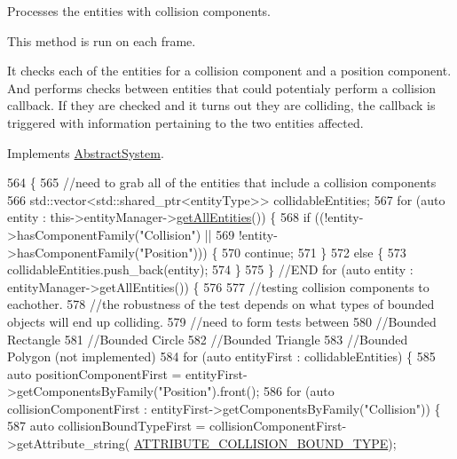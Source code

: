 Processes the entities with collision components. 

This method is run on each frame.

It checks each of the entities for a collision component and a position component. And performs checks between entities that could potentialy perform a collision callback. If they are checked and it turns out they are colliding, the callback is triggered with information pertaining to the two entities affected. 

Implements \hyperlink{class_abstract_system_af8bfe74feb5df2b5e3fff67bfe1106b9}{Abstract\-System}.


\begin{DoxyCode}
564                              \{
565     \textcolor{comment}{//need to grab all of the entities that include a collision components}
566     std::vector<std::shared\_ptr<entityType>> collidableEntities;
567     \textcolor{keywordflow}{for} (\textcolor{keyword}{auto} entity : this->entityManager->\hyperlink{class_entity_manager_a452113e422a9c501bb008761f7609e33}{getAllEntities}()) \{
568         \textcolor{keywordflow}{if} ((!entity->hasComponentFamily(\textcolor{stringliteral}{"Collision"}) ||
569             !entity->hasComponentFamily(\textcolor{stringliteral}{"Position"}))) \{
570             \textcolor{keywordflow}{continue};
571         \}
572         \textcolor{keywordflow}{else} \{
573             collidableEntities.push\_back(entity);
574         \}
575     \} \textcolor{comment}{//END for (auto entity : entityManager->getAllEntities()) \{}
576 
577     \textcolor{comment}{//testing collision components to eachother.}
578     \textcolor{comment}{//the robustness of the test depends on what types of bounded objects will end up colliding.}
579     \textcolor{comment}{//need to form tests between}
580       \textcolor{comment}{//Bounded Rectangle}
581       \textcolor{comment}{//Bounded Circle}
582       \textcolor{comment}{//Bounded Triangle}
583       \textcolor{comment}{//Bounded Polygon (not implemented)}
584     \textcolor{keywordflow}{for} (\textcolor{keyword}{auto} entityFirst : collidableEntities) \{
585         \textcolor{keyword}{auto} positionComponentFirst = entityFirst->getComponentsByFamily(\textcolor{stringliteral}{"Position"}).front();
586         \textcolor{keywordflow}{for} (\textcolor{keyword}{auto} collisionComponentFirst : entityFirst->getComponentsByFamily(\textcolor{stringliteral}{"Collision"})) \{
587         \textcolor{keyword}{auto} collisionBoundTypeFirst = collisionComponentFirst->getAttribute\_string(
      \hyperlink{_a_e___attributes_8h_a22ab960bb5b8b4b1350c7a25cadc49a5}{ATTRIBUTE\_COLLISION\_BOUND\_TYPE});

\end{DoxyCode}
